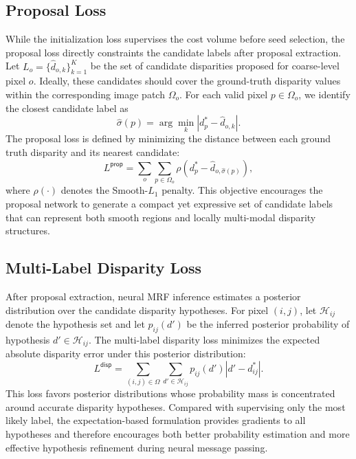 \subsection{Proposal Loss}
While the initialization loss supervises the cost volume before seed selection, the proposal loss directly constraints the candidate labels after proposal extraction.
Let $L_o=\{\hat{d}_{o,k}\}_{k=1}^{K}$ be the set of candidate disparities proposed for coarse-level pixel $o$.
Ideally, these candidates should cover the ground-truth disparity values within the corresponding image patch $\Omega_o$.
For each valid pixel $p\in\Omega_o$, we identify the closest candidate label as
\begin{equation}
	\hat{\sigma}(p)
	=
	\arg\min_{k}
	\left| d_p^*-\hat{d}_{o,k} \right|.
	\label{eq:nearest-proposal}
\end{equation} 
The proposal loss is defined by minimizing the distance between each ground truth disparity and its nearest candidate:
\begin{equation}
	L^{\textsf{prop}}
	=
	\sum_o
	\sum_{p\in\Omega_o}
	\rho
	\left(
	d_p^*-\hat{d}_{o,\hat{\sigma}(p)}
	\right),
	\label{eq:l-prop}
\end{equation}
where $\rho(\cdot)$ denotes the Smooth-$L_1$ penalty.
This objective encourages the proposal network to generate a compact yet expressive set of candidate labels that can represent both smooth regions and locally multi-modal disparity structures.

\subsection{Multi-Label Disparity Loss}
After proposal extraction, neural MRF inference estimates a posterior distribution over the candidate disparity hypotheses. 
For pixel $(i,j)$, let $\mathcal{H}_{ij}$ denote the hypothesis set and let $p_{ij}(d')$ be the inferred posterior probability of hypothesis $d'\in\mathcal{H}_{ij}$. 
The multi-label disparity loss minimizes the expected absolute disparity error under this posterior distribution:
\begin{equation}
	L^{\textsf{disp}}
	=
	\sum_{(i,j)\in\Omega}
	\sum_{d'\in\mathcal{H}_{ij}}
	p_{ij}(d')
	\left| d'-d_{ij}^* \right|.
	\label{eq:loss-est}
\end{equation}
This loss favors posterior distributions whose probability mass is concentrated around accurate disparity hypotheses. 
Compared with supervising only the most likely label, the expectation-based formulation provides gradients to all hypotheses and therefore encourages both better probability estimation and more effective hypothesis refinement during neural message passing. 


